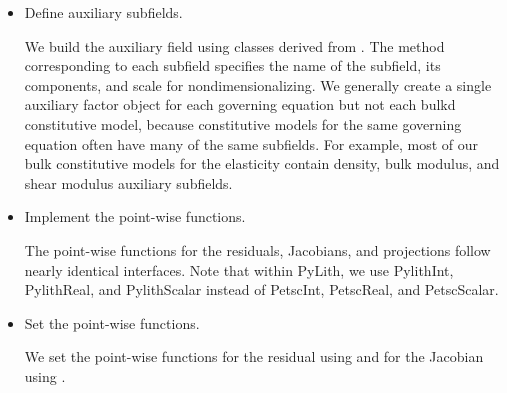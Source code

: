 \begin{itemize}
\item Define auxiliary subfields.

  We build the auxiliary field using classes derived from
  . The method
  corresponding to each subfield specifies the name of the subfield,
  its components, and scale for nondimensionalizing. We generally
  create a single auxiliary factor object for each governing equation
  but not each bulkd constitutive model, because constitutive models
  for the same governing equation often have many of the same
  subfields. For example, most of our bulk constitutive models for the
  elasticity contain density, bulk modulus, and shear modulus
  auxiliary subfields.


\item Implement the point-wise functions.

  The point-wise functions for the residuals, Jacobians, and
  projections follow nearly identical interfaces. Note that within
  PyLith, we use PylithInt, PylithReal, and PylithScalar instead of
  PetscInt, PetscReal, and PetscScalar.

\item Set the point-wise functions.

  We set the point-wise functions for the residual using
   and for the Jacobian using
  .
  
\end{itemize}

